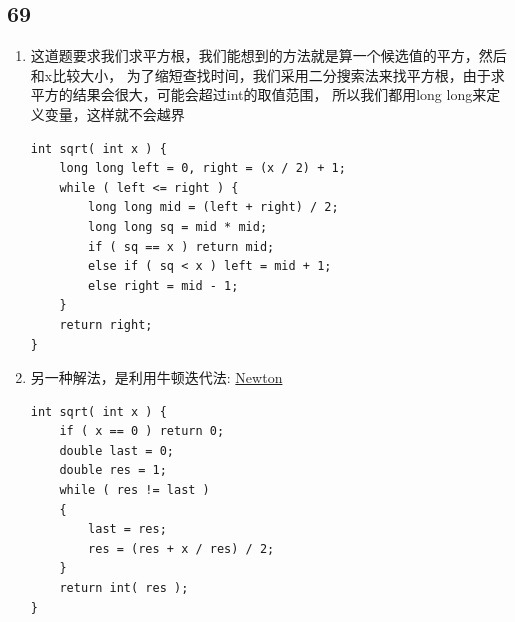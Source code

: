\documentclass[12pt,a4paper]{article}
\begin{document}
\subsection{69}
\begin{enumerate}
\item
\begin{CJK}{UTF8}{gbsn}
这道题要求我们求平方根，我们能想到的方法就是算一个候选值的平方，然后和x比较大小，
为了缩短查找时间，我们采用二分搜索法来找平方根，由于求平方的结果会很大，可能会超过int的取值范围，
所以我们都用long long来定义变量，这样就不会越界
\end{CJK}
\begin{lstlisting}
int sqrt( int x ) {
	long long left = 0, right = (x / 2) + 1;
	while ( left <= right ) {
		long long mid = (left + right) / 2;
		long long sq = mid * mid;
		if ( sq == x ) return mid;
		else if ( sq < x ) left = mid + 1;
		else right = mid - 1;
	}
	return right;
}
\end{lstlisting}
\item
\begin{CJK}{UTF8}{gbsn}
另一种解法，是利用牛顿迭代法: \href{http://www.cnblogs.com/AnnieKim/archive/2013/04/18/3028607.html}{Newton}
\end{CJK}
\begin{lstlisting}
int sqrt( int x ) {
	if ( x == 0 ) return 0;
	double last = 0;
	double res = 1;
	while ( res != last )
	{
		last = res;
		res = (res + x / res) / 2;
	}
	return int( res );
}
\end{lstlisting}
\end{enumerate}
\end{document}
